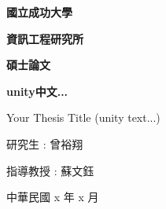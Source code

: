 
\begin{titlepage}
    \centering
    {\fontsize{36pt}{\baselineskip}\selectfont \textbf{國立成功大學}} \par \vspace{0.5cm}
    {\fontsize{24pt}{\baselineskip}\selectfont \textbf{資訊工程研究所}} \par \vspace{0.5cm}
    {\fontsize{24pt}{\baselineskip}\selectfont \textbf{碩士論文}} \par \vspace{2cm}
    {\fontsize{48pt}{\baselineskip}\selectfont \textbf{unity中文...}} \par \vspace{0.5cm}
    {\fontsize{36pt}{\baselineskip}\selectfont Your Thesis Title (unity text...)} \par \vspace{2cm}
    {\fontsize{24pt}{\baselineskip}\selectfont 研究生 : 曾裕翔} \par \vspace{0.5cm}
    {\fontsize{20pt}{\baselineskip}\selectfont 指導教授 : 蘇文鈺} \par \vspace{2cm}
    {\fontsize{20pt}{\baselineskip}\selectfont 中華民國 x 年 x 月} \par
\end{titlepage}

\restoregeometry
